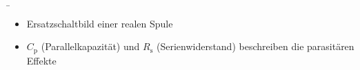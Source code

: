 \begin{frame}

	\b{
		\begin{itemize}
			\item Ersatzschaltbild einer realen Spule
		\end{itemize}
			\begin{figure}[H]
				\centering
				
			\end{figure}
		\begin{itemize}
			\item $C_\mathrm{p}$ (Parallelkapazität) und $R_\mathrm{s}$ (Serienwiderstand) beschreiben die parasitären Effekte
		\end{itemize}
	}

\end{frame}

